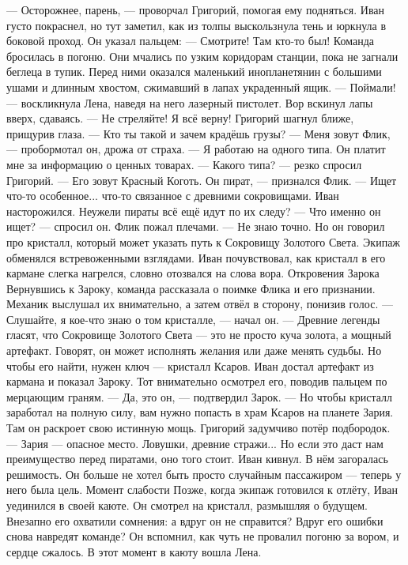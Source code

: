 \documentclass[12pt,a4paper]{book}
\begin{document}
— Осторожнее, парень, — проворчал Григорий, помогая ему подняться.
Иван густо покраснел, но тут заметил, как из толпы выскользнула тень и юркнула в боковой проход. Он указал пальцем:
— Смотрите! Там кто-то был!
Команда бросилась в погоню. Они мчались по узким коридорам станции, пока не загнали беглеца в тупик. Перед ними оказался маленький инопланетянин с большими ушами и длинным хвостом, сжимавший в лапах украденный ящик.
— Поймали! — воскликнула Лена, наведя на него лазерный пистолет.
Вор вскинул лапы вверх, сдаваясь.
— Не стреляйте! Я всё верну!
Григорий шагнул ближе, прищурив глаза.
— Кто ты такой и зачем крадёшь грузы?
— Меня зовут Флик, — пробормотал он, дрожа от страха. — Я работаю на одного типа. Он платит мне за информацию о ценных товарах.
— Какого типа? — резко спросил Григорий.
— Его зовут Красный Коготь. Он пират, — признался Флик. — Ищет что-то особенное... что-то связанное с древними сокровищами.
Иван насторожился. Неужели пираты всё ещё идут по их следу?
— Что именно он ищет? — спросил он.
Флик пожал плечами.
— Не знаю точно. Но он говорил про кристалл, который может указать путь к Сокровищу Золотого Света.
Экипаж обменялся встревоженными взглядами. Иван почувствовал, как кристалл в его кармане слегка нагрелся, словно отозвался на слова вора.
Откровения Зарока
Вернувшись к Зароку, команда рассказала о поимке Флика и его признании. Механик выслушал их внимательно, а затем отвёл в сторону, понизив голос.
— Слушайте, я кое-что знаю о том кристалле, — начал он. — Древние легенды гласят, что Сокровище Золотого Света — это не просто куча золота, а мощный артефакт. Говорят, он может исполнять желания или даже менять судьбы. Но чтобы его найти, нужен ключ — кристалл Ксаров.
Иван достал артефакт из кармана и показал Зароку. Тот внимательно осмотрел его, поводив пальцем по мерцающим граням.
— Да, это он, — подтвердил Зарок. — Но чтобы кристалл заработал на полную силу, вам нужно попасть в храм Ксаров на планете Зария. Там он раскроет свою истинную мощь.
Григорий задумчиво потёр подбородок.
— Зария — опасное место. Ловушки, древние стражи... Но если это даст нам преимущество перед пиратами, оно того стоит.
Иван кивнул. В нём загоралась решимость. Он больше не хотел быть просто случайным пассажиром — теперь у него была цель.
Момент слабости
Позже, когда экипаж готовился к отлёту, Иван уединился в своей каюте. Он смотрел на кристалл, размышляя о будущем. Внезапно его охватили сомнения: а вдруг он не справится? Вдруг его ошибки снова навредят команде? Он вспомнил, как чуть не провалил погоню за вором, и сердце сжалось.
В этот момент в каюту вошла Лена.
\end{document}
